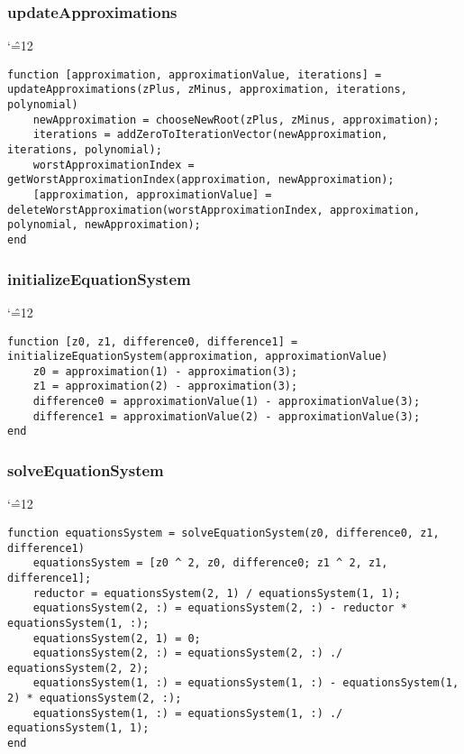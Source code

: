 \documentclass[12pt]{report}
\newenvironment{simplechar}{%
   \catcode`\^=12
}{}
\begin{document}
\subsubsection{updateApproximations}
\begin{simplechar}
\begin{lstlisting}
function [approximation, approximationValue, iterations] = updateApproximations(zPlus, zMinus, approximation, iterations, polynomial)
    newApproximation = chooseNewRoot(zPlus, zMinus, approximation);
    iterations = addZeroToIterationVector(newApproximation, iterations, polynomial);
    worstApproximationIndex = getWorstApproximationIndex(approximation, newApproximation);
    [approximation, approximationValue] = deleteWorstApproximation(worstApproximationIndex, approximation, polynomial, newApproximation);
end
\end{lstlisting}
\end{simplechar}

\subsubsection{initializeEquationSystem}
\begin{simplechar}
\begin{lstlisting}
function [z0, z1, difference0, difference1] = initializeEquationSystem(approximation, approximationValue)
    z0 = approximation(1) - approximation(3);
    z1 = approximation(2) - approximation(3);
    difference0 = approximationValue(1) - approximationValue(3);
    difference1 = approximationValue(2) - approximationValue(3);
end
\end{lstlisting}
\end{simplechar}

\subsubsection{solveEquationSystem}
\begin{simplechar}
\begin{lstlisting}
function equationsSystem = solveEquationSystem(z0, difference0, z1, difference1)
    equationsSystem = [z0 ^ 2, z0, difference0; z1 ^ 2, z1, difference1];
    reductor = equationsSystem(2, 1) / equationsSystem(1, 1);
    equationsSystem(2, :) = equationsSystem(2, :) - reductor * equationsSystem(1, :);
    equationsSystem(2, 1) = 0;
    equationsSystem(2, :) = equationsSystem(2, :) ./ equationsSystem(2, 2);
    equationsSystem(1, :) = equationsSystem(1, :) - equationsSystem(1, 2) * equationsSystem(2, :);
    equationsSystem(1, :) = equationsSystem(1, :) ./ equationsSystem(1, 1);
end
\end{lstlisting}
\end{simplechar}
\end{document}
